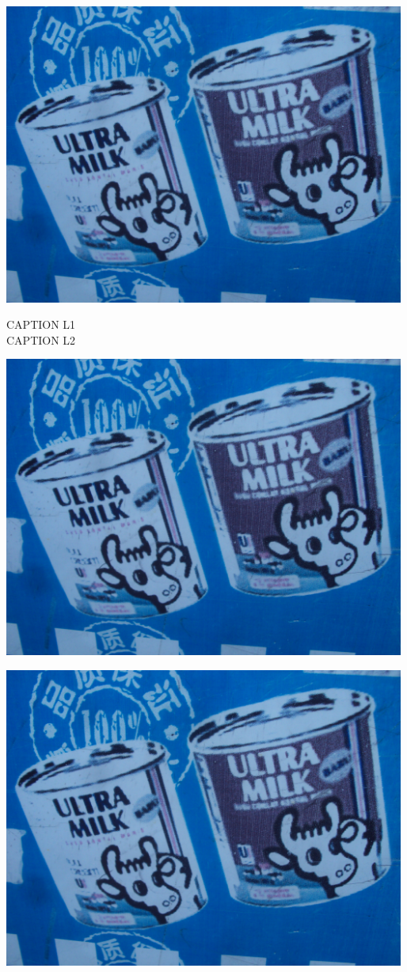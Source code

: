 \documentclass[10pt,letterpaper]{article}
\begin{document}
\vspace{0.25in}
\includegraphics[width=5.19in]{landscape.jpg}

CAPTION L1\\
CAPTION L2\\
\pagebreak

\includegraphics[width=5.19in]{landscape.jpg}

\vspace{0.25in}
\includegraphics[width=5.19in]{landscape.jpg}
\end{document}
